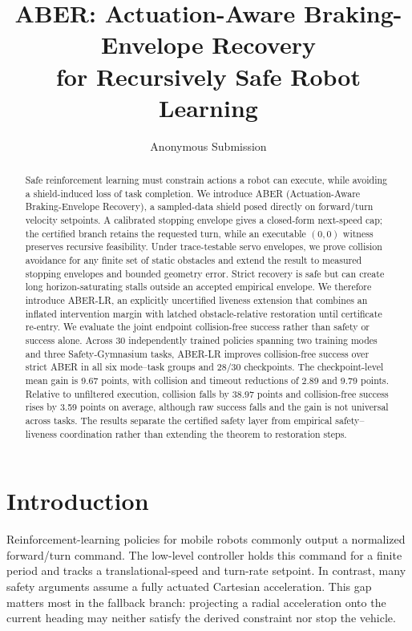 \documentclass[letterpaper]{article}
\title{ABER: Actuation-Aware Braking-Envelope Recovery\\
for Recursively Safe Robot Learning}
\author{Anonymous Submission}
\begin{document}
\maketitle

\begin{abstract}
Safe reinforcement learning must constrain actions a robot can execute, while
avoiding a shield-induced loss of task completion.  We introduce ABER
(Actuation-Aware Braking-Envelope Recovery), a sampled-data shield posed
directly on forward/turn velocity setpoints.  A calibrated stopping envelope
gives a closed-form next-speed cap; the certified branch retains the requested
turn, while an executable $(0,0)$ witness preserves recursive feasibility.
Under trace-testable servo envelopes, we prove collision avoidance for any
finite set of static obstacles and extend the result to measured stopping
envelopes and bounded geometry error.  Strict recovery is safe but can create
long horizon-saturating stalls outside an accepted empirical envelope.  We
therefore introduce ABER-LR, an explicitly uncertified liveness extension
that combines an inflated intervention margin with latched obstacle-relative
restoration until certificate re-entry.  We evaluate the joint endpoint
collision-free success rather than safety or success alone.  Across 30
independently trained policies spanning two training modes and three
Safety-Gymnasium tasks, ABER-LR improves collision-free success over strict
ABER in all six mode--task groups and 28/30 checkpoints.  The checkpoint-level
mean gain is 9.67 points, with collision and timeout reductions of 2.89 and
9.79 points.  Relative to unfiltered execution, collision falls by 38.97
points and collision-free success rises by 3.59 points on average, although
raw success falls and the gain is not universal across tasks.  The results
separate the certified safety layer from empirical safety--liveness
coordination rather than extending the theorem to restoration steps.
\end{abstract}

\section{Introduction}

Reinforcement-learning policies for mobile robots commonly output a normalized
forward/turn command.  The low-level controller holds this command for a finite
period and tracks a translational-speed and turn-rate setpoint.  In contrast,
many safety arguments assume a fully actuated Cartesian acceleration.  This
gap matters most in the fallback branch: projecting a radial acceleration onto
the current heading may neither satisfy the derived constraint nor stop the
vehicle.
\end{document}
